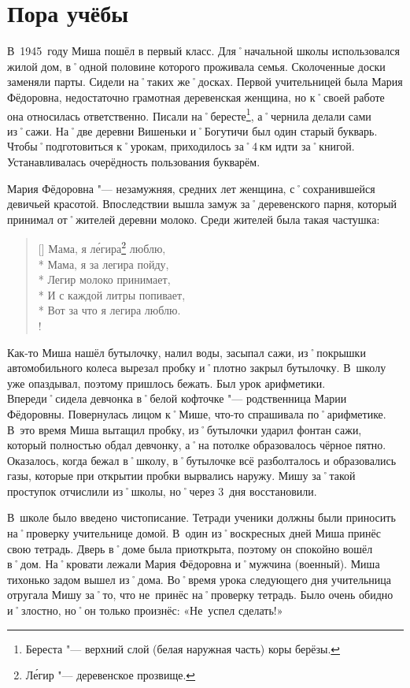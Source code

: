 ﻿\chapter{Пора учёбы}
В~1945~году Миша пошёл в первый класс. Для˚начальной школы использовался жилой дом, в˚одной половине которого проживала семья. Сколоченные доски заменяли парты. Сидели на˚таких же˚досках. Первой учительницей была Мария Фёдоровна, недостаточно грамотная деревенская женщина, но к˚своей работе она относилась ответственно. Писали на˚бересте\footnote{Береста "--- верхний слой (белая наружная часть) коры берёзы.}, а˚чернила делали сами из˚сажи. На˚две деревни Вишеньки и˚Богутичи был один старый букварь. Чтобы˚подготовиться к˚урокам, приходилось за˚4\,км идти за˚книгой. Устанавливалась очерёдность пользования букварём.

Мария Фёдоровна "--- незамужняя, средних лет женщина, с˚сохранившейся девичьей красотой. Впоследствии вышла замуж за˚деревенского парня, который принимал от˚жителей деревни молоко. Среди жителей была такая частушка:

\settowidth{\versewidth}{Легир молоко принимает,}		%
\begin{verse}[\versewidth]
	Мама, я л\'{е}гира\footnote{Л\'{е}гир "--- деревенское прозвище.} люблю, \\* 
	Мама, я за легира пойду, \\*	
	Легир молоко принимает, \\*
	И с каждой литры попивает, \\*
	Вот за что я легира люблю. \\!
\end{verse}

Как-то Миша нашёл бутылочку, налил воды, засыпал сажи, из˚покрышки автомобильного колеса вырезал пробку и˚плотно закрыл бутылочку. В~школу уже опаздывал, поэтому пришлось бежать. Был урок арифметики. Впереди˚сидела девчонка в˚белой кофточке "--- родственница Марии Фёдоровны. Повернулась лицом к˚Мише, что-то спрашивала по˚арифметике. В~это время Миша вытащил пробку, из˚бутылочки ударил фонтан сажи, который полностью обдал девчонку, а˚на потолке образовалось чёрное пятно. Оказалось, когда бежал в˚школу, в˚бутылочке всё разболталось и образовались газы, которые при открытии пробки вырвались наружу. Мишу за˚такой проступок отчислили из˚школы, но˚через 3~дня восстановили.

В~школе было введено чистописание. Тетради ученики должны были приносить на˚проверку учительнице домой. В~один из˚воскресных дней Миша принёс свою тетрадь. Дверь в˚доме была приоткрыта, поэтому он спокойно вошёл в˚дом. На˚кровати лежали Мария Фёдоровна и˚мужчина (военный). Миша тихонько задом вышел из˚дома. Во˚время урока следующего дня учительница отругала Мишу за˚то, что не~принёс на˚проверку тетрадь. Было очень обидно и˚злостно, но˚он только произнёс: «Не~успел сделать!»

